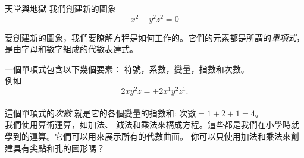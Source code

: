 \begin{surferPage}{天堂與地獄}
我們創建新的圖象\\
\smallskip
\[x^2	- y^2z^2	= 0\]

\singlespacing
要創建新的圖象，我們要瞭解方程是如何工作的。它們的元素都是所謂的\textit{單項式}，是由字母和數字組成的代數表達式。

\singlespacing
一個單項式包含以下幾個要素：
符號，系數，變量，指數和次數。\\

\singlespacing
例如
\smallskip
\[2xy^2z = +2x^1y^2z^1.\]
\\
\smallskip
這個單項式的\textit{次數} 就是它的各個變量的指數和: 次數$ = 1+2+1=4$。\\

\singlespacing
我們使用算術運算，如加法、 減法和乘法來構成方程。這些都是我們在小學時就學到的運算。它們可以用來展示所有的代數曲面。
\singlespacing
你可以只使用加法和乘法來創建具有尖點和孔的圖形嗎？
\end{surferPage}

